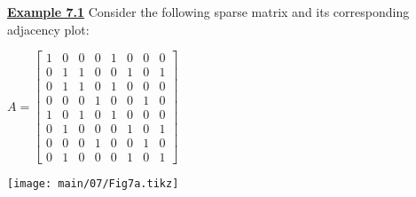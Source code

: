 \newpage
\vskip 8pt
\noindent
{\bf\underline {Example 7.1}}
\vskip 7pt
\noindent
Consider the following sparse matrix and its corresponding adjacency plot:
\vskip 2pt
\noindent
\begin{table}[H]
  \begin{minipage}[b]{0.50\linewidth}
    \vskip 5pt
    \begin{center}
      $A=
      \begin{bmatrix}
        1 & 0 & 0 & 0 & 1 & 0 & 0 & 0 \\
        0 & 1 & 1 & 0 & 0 & 1 & 0 & 1 \\
        0 & 1 & 1 & 0 & 1 & 0 & 0 & 0 \\
        0 & 0 & 0 & 1 & 0 & 0 & 1 & 0 \\
        1 & 0 & 1 & 0 & 1 & 0 & 0 & 0 \\
        0 & 1 & 0 & 0 & 0 & 1 & 0 & 1 \\
        0 & 0 & 0 & 1 & 0 & 0 & 1 & 0 \\
        0 & 1 & 0 & 0 & 0 & 1 & 0 & 1
      \end{bmatrix}$
    \end{center}
    \vspace{10mm}
  \end{minipage}
  \begin{minipage}[b]{0.49\linewidth}
    \begin{center}
      \texttt{[image: main/07/Fig7a.tikz]}
    \end{center}
  \end{minipage}
\end{table}

